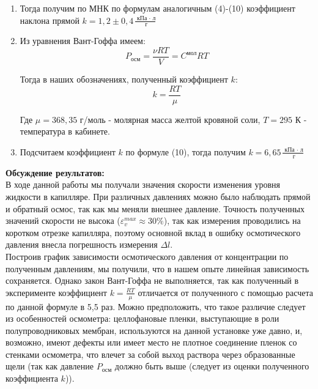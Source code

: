 \documentclass[a4paper, 12pt]{article}%
\begin{document}
\begin{enumerate}
\item Тогда получим по МНК по формулам аналогичным (4)-(10) коэффициент наклона прямой $k = 1,2 \pm 0,4 \frac{\text{ кПа } \cdot \text{ л}}{\text{ г}}$

\item Из уравнения Вант-Гоффа имеем: 
	\begin{equation}
		 P_{\text{осм}} = \frac{\nu RT}{V} = C^{\text{мол}} RT 
	\end{equation}

Тогда в наших обозначениях, полученный коэффициент $k$:  
\begin{equation}
	k = \frac{RT}{\mu}
\end{equation}

Где $\mu = 368,35$ г/моль - молярная масса желтой кровяной соли, $T = 295$ К - температура в кабинете. 

\item Подсчитаем коэффициент $k$ по формуле (10), тогда получим $k = 6, 65 \frac{\text{ кПа } \cdot \text{ л}}{\text{ г}}$  
\end{enumerate}

\newpage
	\textbf{Обсуждение результатов: }\\
	
	
		В ходе данной работы мы получали значения скорости изменения уровня жидкости в капилляре. При различных давлениях можно было наблюдать прямой и обратный осмос, так как мы меняли внешнее давление. Точность полученных значений скорости не высока ($\varepsilon_v^{max} \approx 30\%$), так как измерения проводились на коротком отрезке капилляра, поэтому основной вклад в ошибку осмотического давления внесла погрешность измерения $\Delta l$.\\
		
		
		Построив график зависимости осмотического давления от концентрации по полученным давлениям, мы получили, что в нашем опыте линейная зависимость сохраняется. Однако закон Вант-Гоффа не выполняется, так как полученный в эксперименте коэффициент $k = \frac{RT}{\mu}$ отличается от полученного с помощью расчета по данной формуле в 5,5 раз. Можно предположить, что такое различие следует из особенностей осмометра: целлофановые пленки, выступающие в роли полупроводниковых мембран, используются на данной установке уже давно, и, возможно, имеют дефекты или имеет место не плотное соединение пленок со стенками осмометра, что влечет за собой выход раствора через образованные щели (так как давление $P_{\text{осм}}$ должно быть выше (следует из оценки полученного коэффициента $k$)).\\
		
\end{document}
